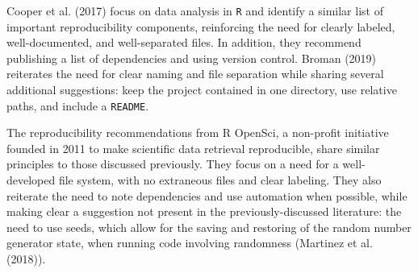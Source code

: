 \documentclass[12pt,twoside]{reedthesis}
\begin{document}
Cooper et al. (2017) focus on data analysis in \texttt{R} and identify a
similar list of important reproducibility components, reinforcing the
need for clearly labeled, well-documented, and well-separated files. In
addition, they recommend publishing a list of dependencies and using
version control. Broman (2019) reiterates the need for clear naming and
file separation while sharing several additional suggestions: keep the
project contained in one directory, use relative paths, and include a
\texttt{README}.

The reproducibility recommendations from R OpenSci, a non-profit
initiative founded in 2011 to make scientific data retrieval
reproducible, share similar principles to those discussed previously.
They focus on a need for a well-developed file system, with no
extraneous files and clear labeling. They also reiterate the need to
note dependencies and use automation when possible, while making clear a
suggestion not present in the previously-discussed literature: the need
to use seeds, which allow for the saving and restoring of the random
number generator state, when running code involving randomness (Martinez
et al. (2018)).
\end{document}
